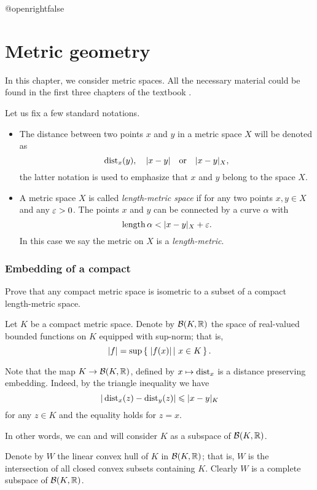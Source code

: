 \csname @openrightfalse\endcsname
\chapter{Metric geometry}

In this chapter, we consider metric spaces.
All the necessary material could be found in the first three chapters of the textbook \cite{bbi}. 

Let us fix a few standard notations.
\begin{itemize}
\item The distance between two points $x$ and $y$ in a metric space $X$
will be denoted as 
\[\operatorname{\rm dist}\nolimits_x(y),
\quad
|x-y|
\quad\text{or}\quad
|x-y|_X,
\]
the latter notation is used to emphasize that $x$ and $y$ belong to the space $X$.
\item A metric space $X$ is called {}\emph{length-metric space} if for any two points $x,y\in X$ and any $\varepsilon>0$. The points $x$ and $y$ can be connected by a curve $\alpha$
with
\[\length\alpha<|x-y|_X+\eps.\]
In this case we say the metric on $X$ is a \emph{length-metric}.
\end{itemize}

\subsection*{Embedding of a compact}
\label{compact} 

\begin{pr}
Prove that any compact metric space 
is isometric to 
a subset of a compact length-metric space.
\end{pr}

Let $K$ be a compact metric space.
Denote by $\mathcal{B}(K,\mathbb{R})$ the space of real-valued bounded functions on $K$
equipped with sup-norm; 
that is, 
\[|f|=\sup\set{|f(x)|}{x\in K}.\]

Note that the map $K\to \mathcal{B}(K,\mathbb{R})$, defined by $x\mapsto \operatorname{\rm dist}\nolimits_x$
is a distance preserving embedding.
Indeed, by the triangle inequality we have
\[|\operatorname{\rm dist}\nolimits_x(z)-\operatorname{\rm dist}\nolimits_y(z)|\leqslant |x-y|_K\]
for any $z\in K$
and the equality holds for $z=x$.

In other words, we can and will consider $K$ as a subspace of $\mathcal{B}(K,\mathbb{R})$.

Denote by $W$ the linear convex hull of $K$ in $\mathcal{B}(K,\mathbb{R})$;
that is, $W$ is the intersection of all closed convex subsets containing $K$. 
Clearly $W$ is a complete subspace of $\mathcal{B}(K,\mathbb{R})$.


